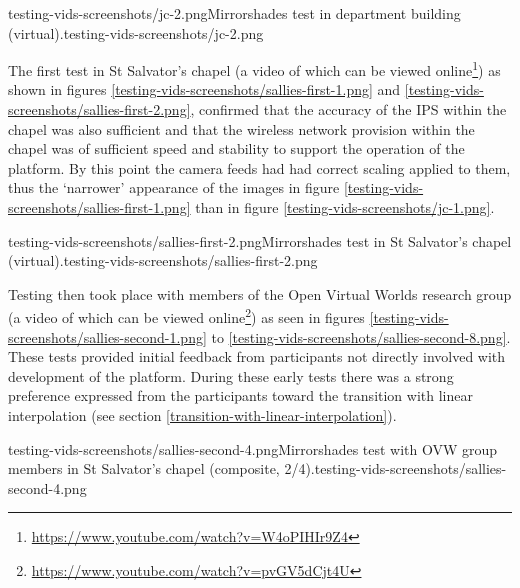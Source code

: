        {testing-vids-screenshots/jc-2.png}{Mirrorshades test in department building (virtual).}{testing-vids-screenshots/jc-2.png}


The first test in St Salvator's chapel (a video of which can be viewed online\footnote{\url{https://www.youtube.com/watch?v=W4oPIHIr9Z4}}) as shown in figures \ref{testing-vids-screenshots/sallies-first-1.png} and \ref{testing-vids-screenshots/sallies-first-2.png}, confirmed that the accuracy of the IPS within the chapel was also sufficient and that the wireless network provision within the chapel was of sufficient speed and stability to support the operation of the platform. By this point the camera feeds had had correct scaling applied to them, thus the `narrower' appearance of the images in figure \ref{testing-vids-screenshots/sallies-first-1.png} than in figure \ref{testing-vids-screenshots/jc-1.png}.

       {testing-vids-screenshots/sallies-first-2.png}{Mirrorshades test in St Salvator's chapel (virtual).}{testing-vids-screenshots/sallies-first-2.png}

\newpage

Testing then took place with members of the Open Virtual Worlds research group (a video of which can be viewed online\footnote{\url{https://www.youtube.com/watch?v=pvGV5dCjt4U}}) as seen in figures \ref{testing-vids-screenshots/sallies-second-1.png} to \ref{testing-vids-screenshots/sallies-second-8.png}. These tests provided initial feedback from participants not directly involved with development of the platform. During these early tests there was a strong preference expressed from the participants toward the transition with linear interpolation (see section \ref{transition-with-linear-interpolation}).

       {testing-vids-screenshots/sallies-second-4.png}{Mirrorshades test with OVW group members in St Salvator's chapel (composite, 2/4).}{testing-vids-screenshots/sallies-second-4.png}

